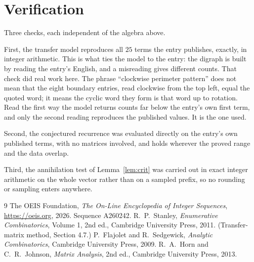 \documentclass[11pt,a4paper]{article}
\theoremstyle{plain}
\theoremstyle{definition}
\begin{document}
\section{Verification}

Three checks, each independent of the algebra above.

First, the transfer model reproduces all $25$ terms the entry publishes, exactly, in
integer arithmetic. This is what ties the model to the entry: the digraph is built by reading
the entry's English, and a misreading gives different counts. That check did real work here. The phrase ``clockwise perimeter pattern'' does not mean that the eight boundary entries, read clockwise from the top left, equal the quoted word; it means the cyclic word they form is that word up to rotation. Read the first way the model returns counts far below the entry's own first term, and only the second reading reproduces the published values. It is the one used.

Second, the conjectured recurrence was evaluated directly on the entry's own published terms,
with no matrices involved, and holds wherever the proved range and the data overlap.

Third, the annihilation test of Lemma~\ref{lem:crit} was carried out in exact integer
arithmetic on the whole vector rather than on a sampled prefix, so no rounding or sampling
enters anywhere.

\begin{thebibliography}{9}
 The OEIS Foundation, \emph{The On-Line Encyclopedia of Integer
Sequences}, \url{https://oeis.org}, 2026. Sequence A260242.
 R.~P.~Stanley, \emph{Enumerative Combinatorics}, Volume 1, 2nd ed.,
Cambridge University Press, 2011. (Transfer-matrix method, Section 4.7.)
 P.~Flajolet and R.~Sedgewick, \emph{Analytic Combinatorics}, Cambridge
University Press, 2009.
 R.~A.~Horn and C.~R.~Johnson, \emph{Matrix Analysis}, 2nd ed., Cambridge
University Press, 2013.
\end{thebibliography}
\end{document}
